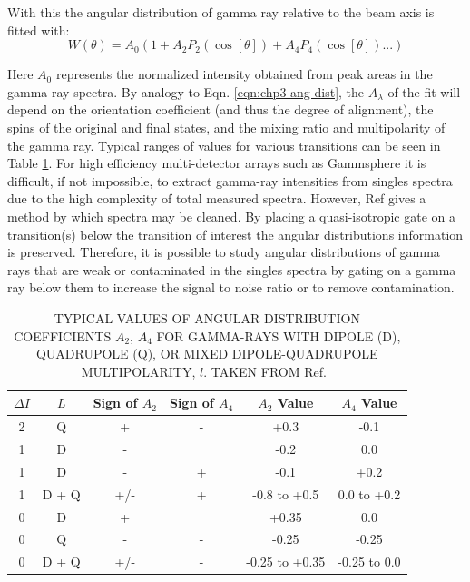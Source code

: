 With this the angular distribution of gamma ray relative to the beam axis is fitted with:
\begin{equation}
\label{eqn:chp3-ang-dist-fit}
W(\theta{}) = A_{0}(1 + A_{2} P_{2}(\cos[\theta{}]) + A_{4} P_{4}(\cos[\theta{}]) ...)
\end{equation}

Here $A_{0}$ represents the normalized intensity obtained from peak areas in the gamma ray spectra. By analogy to Eqn. \ref{eqn:chp3-ang-dist}, the $A_{\lambda{}}$ of the fit will depend on the orientation coefficient (and thus the degree of alignment), the spins of the original and final states, and the mixing ratio and multipolarity of the gamma ray. Typical ranges of values for various transitions can be seen in Table \ref{tbl:chp3-ang-dis-fit-ranges}. For high efficiency multi-detector arrays such as Gammsphere it is difficult, if not impossible, to extract gamma-ray intensities from singles spectra due to the high complexity of total measured spectra. However, Ref \cite{angDistGates} gives a method by which spectra may be cleaned. By placing a quasi-isotropic gate on a transition(s) below the transition of interest the angular distributions information is preserved. Therefore, it is possible to study angular distributions of gamma rays that are weak or contaminated in the singles spectra by gating on a gamma ray below them to increase the signal to noise ratio or to remove contamination.

\begin{table}[t]
\setlength{\abovecaptionskip}{-2pt}   %
\setlength{\belowcaptionskip}{0.5pt}
\caption[\uppercase{Typical values of angular distribution coefficients $A_2$, $A_4$ for gamma-rays with Dipole (D), Quadrupole (Q), or mixed Dipole-Quadrupole Multipolarity, $l$.}]{\uppercase{Typical values of angular distribution coefficients $A_2$, $A_4$ for gamma-rays with Dipole (D), Quadrupole (Q), or mixed Dipole-Quadrupole Multipolarity, $l$.  Taken from} Ref.~\cite{angDistAVals}} \label{tbl:chp3-ang-dis-fit-ranges}
\centering
\begin{tabular}{c@{\hskip 0.3in}c@{\hskip 0.2in}c@{\hskip 0.15in}c@{\hskip 0.2in}c@{\hskip 0.3in}c}
\hline\hline
$\Delta I$ & $L$ & Sign of $A_2$ & Sign of $A_4$ & $A_2$ Value & $A_4$ Value\\
\hline
2 & Q & + & - & +0.3 & -0.1\\
1 & D & - &  & -0.2 & 0.0\\
1 & D & - & + & -0.1 & +0.2\\
1 & D + Q & +/- & + & -0.8 to +0.5 & 0.0 to +0.2\\
0 & D & + &  & +0.35 & 0.0\\
0 & Q & - & - & -0.25 & -0.25\\
0 & D + Q & +/- & - & -0.25 to +0.35 & -0.25 to 0.0\\
\hline\hline
\end{tabular}
\end{table}

